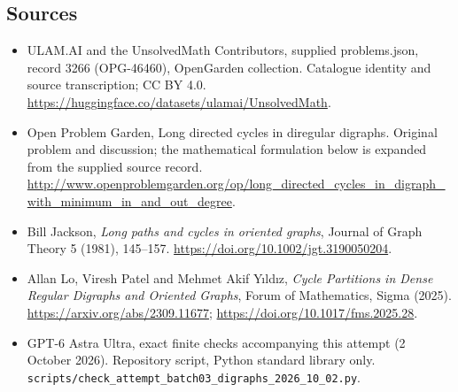 \documentclass[11pt,a4paper]{article}
\begin{document}
\subsection{Sources}
\begin{itemize}
\item[S1] ULAM.AI and the UnsolvedMath Contributors, supplied problems.json, record 3266 (OPG-46460), OpenGarden collection. Catalogue identity and source transcription; CC BY 4.0.
\url{https://huggingface.co/datasets/ulamai/UnsolvedMath}.
\item[S2] Open Problem Garden, Long directed cycles in diregular digraphs. Original problem and discussion; the mathematical formulation below is expanded from the supplied source record.
\url{http://www.openproblemgarden.org/op/long_directed_cycles_in_digraph_with_minimum_in_and_out_degree}.
\item[S3] Bill Jackson, \emph{Long paths and cycles in oriented graphs}, Journal of Graph Theory 5 (1981), 145--157. \url{https://doi.org/10.1002/jgt.3190050204}.
\item[S4] Allan Lo, Viresh Patel and Mehmet Akif Y\i ld\i z, \emph{Cycle Partitions in Dense Regular Digraphs and Oriented Graphs}, Forum of Mathematics, Sigma (2025). \url{https://arxiv.org/abs/2309.11677}; \url{https://doi.org/10.1017/fms.2025.28}.
\item[S9] GPT-6 Astra Ultra, exact finite checks accompanying this attempt (2 October 2026). Repository script, Python standard library only. \texttt{scripts/check\_attempt\_batch03\_digraphs\_2026\_10\_02.py}.
\end{itemize}
\end{document}
